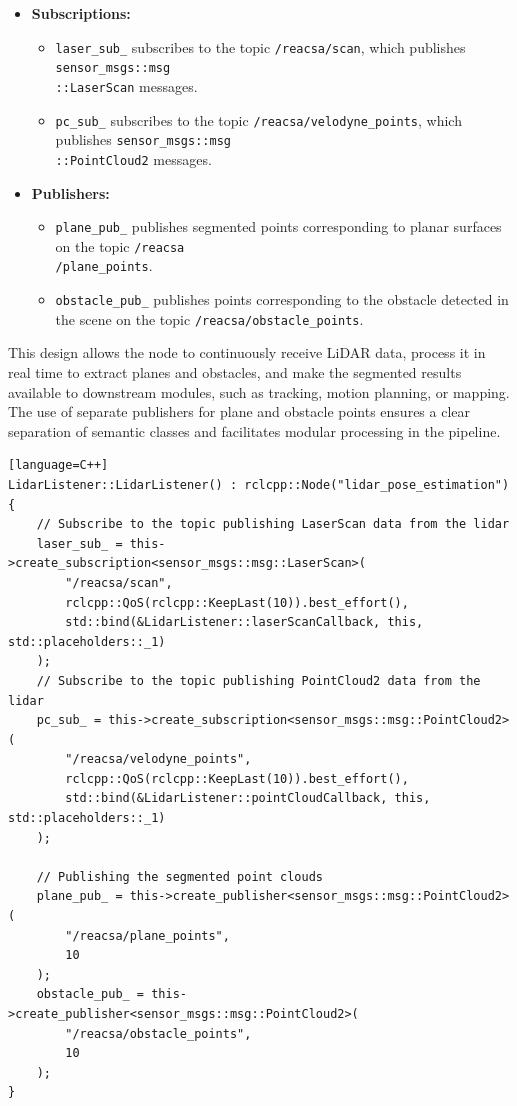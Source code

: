 \begin{itemize}
    \item \textbf{Subscriptions:} 
    \begin{itemize}
        \item \texttt{laser\_sub\_} subscribes to the topic \texttt{/reacsa/scan}, which publishes \texttt{sensor\_msgs::msg} \\ \texttt{::LaserScan} messages. 
        \item \texttt{pc\_sub\_} subscribes to the topic \texttt{/reacsa/velodyne\_points}, which publishes \texttt{sensor\_msgs::msg} \\ \texttt{::PointCloud2} messages. 
    \end{itemize}

    \item \textbf{Publishers:} 
    \begin{itemize}
        \item \texttt{plane\_pub\_} publishes segmented points corresponding to planar surfaces on the topic \texttt{/reacsa}\\\texttt{/plane\_points}.
        \item \texttt{obstacle\_pub\_} publishes points corresponding to the obstacle detected in the scene on the topic \texttt{/reacsa/obstacle\_points}.
    \end{itemize}

\end{itemize}

\noindent This design allows the node to continuously receive LiDAR data, process it in real time to extract planes and obstacles, 
and make the segmented results available to downstream modules, such as tracking, motion planning, or mapping. 
The use of separate publishers for plane and obstacle points ensures a clear separation of semantic classes and facilitates modular processing in the pipeline.


\begin{lstlisting}[basicstyle=\ttfamily\scriptsize][language=C++]
LidarListener::LidarListener() : rclcpp::Node("lidar_pose_estimation")
{
    // Subscribe to the topic publishing LaserScan data from the lidar
    laser_sub_ = this->create_subscription<sensor_msgs::msg::LaserScan>(
        "/reacsa/scan", 
        rclcpp::QoS(rclcpp::KeepLast(10)).best_effort(), 
        std::bind(&LidarListener::laserScanCallback, this, std::placeholders::_1)
    );
    // Subscribe to the topic publishing PointCloud2 data from the lidar
    pc_sub_ = this->create_subscription<sensor_msgs::msg::PointCloud2>(
        "/reacsa/velodyne_points", 
        rclcpp::QoS(rclcpp::KeepLast(10)).best_effort(),
        std::bind(&LidarListener::pointCloudCallback, this, std::placeholders::_1)
    );

    // Publishing the segmented point clouds
    plane_pub_ = this->create_publisher<sensor_msgs::msg::PointCloud2>(
        "/reacsa/plane_points", 
        10
    );
    obstacle_pub_ = this->create_publisher<sensor_msgs::msg::PointCloud2>(
        "/reacsa/obstacle_points", 
        10
    );
}
\end{lstlisting}


